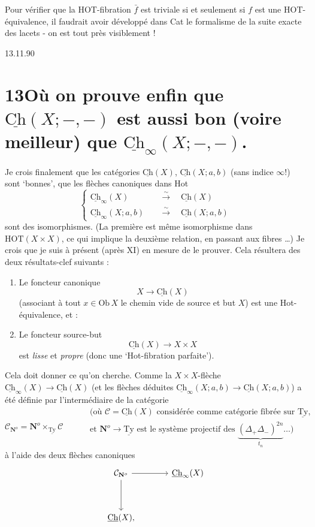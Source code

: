 \documentclass[11pt]{article}
\newcommand{\printedpage}[1]{\marginpar{\footnotesize p.~#1}}
\newcommand{\msp}[1]{\marginpar{\footnotesize [#1]}}
\newcommand{\Ch}{\underline{\mathrm{Ch}}}
\newcommand{\Ty}{\underline{\mathrm{Ty}}}
\begin{document}
Pour vérifier que la HOT-fibration $\bar f$ est triviale si et seulement si $f$ est une HOT-équivalence, il faudrait avoir développé dans Cat le formalisme de la suite exacte des lacets - on est tout près visiblement !

\printedpage{98}
\msp{page 157}

\begin{flushright}
\footnotesize 13.11.90
\end{flushright}

\section*{13\quad Où on prouve enfin que $\Ch(X;-,-)$ est aussi bon (voire meilleur) que $\Ch_\infty(X;-,-)$.}

Je crois finalement que les catégories $\Ch(X)$, $\Ch(X;a,b)$ (sans indice $\infty$!) sont `bonnes', que les flèches canoniques dans Hot
\[
\left\{
\begin{aligned}
\Ch_\infty(X) \quad &\xrightarrow{\sim} \quad \Ch(X)\\
\Ch_\infty(X;a,b) \quad &\xrightarrow{\sim} \quad \Ch(X;a,b)
\end{aligned}
\right.
\]
sont des isomorphismes. (La première est même isomorphisme dans $\mathrm{HOT}(X \times X)$, ce qui implique la deuxième relation, en passant aux fibres \dots) Je crois que je suis à présent (après XI) en mesure de le prouver. Cela résultera des deux résultats-clef suivants :

\begin{enumerate}
\item[1)] Le foncteur canonique
\[
X \longrightarrow \Ch(X)
\]
(associant à tout $x \in \mathrm{Ob}\,X$ le chemin vide de source et but $X$) est une Hot-équivalence, et : %
\item[2)] Le foncteur source-but
\[
\Ch(X) \longrightarrow X \times X
\]
est \textit{lisse} et \textit{propre} (donc une `Hot-fibration parfaite').
\end{enumerate}

Cela doit donner ce qu'on cherche. Comme la $X \times X$-flèche $\Ch_\infty(X) \longrightarrow \Ch(X)$ (et les flèches déduites $\Ch_\infty(X;a,b) \longrightarrow \Ch(X;a,b)$) a été définie par l'intermédiaire de la catégorie
\[
\mathcal{C}_{\mathbf{N}^o} = \mathbf{N}^o \times_{\Ty} \mathcal{C}
\qquad
\begin{aligned}
&\text{(où $\mathcal{C} = \Ch(X)$ considérée comme catégorie fibrée sur $\Ty$,}\\
&\text{et $\mathbf{N}^o \longrightarrow \Ty$ est le système projectif des $\underbrace{(\Delta_+\Delta_-)^{2n}}_{t_n} \dots$)}
\end{aligned}
\]
\msp{page 158}
à l'aide des deux flèches canoniques
\[
\begin{tikzcd}[row sep=huge, column sep=large]
\mathcal{C}_{\mathbf{N}^o} \arrow[r] \arrow[d] & \Ch_\infty(X) \\
\Ch(X), &
\end{tikzcd}
\]
\end{document}
